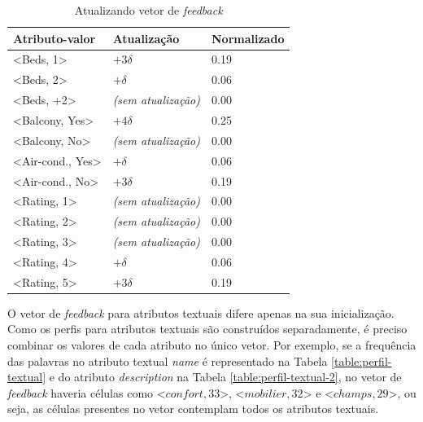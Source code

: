 \begin{table}[]
	\caption{Atualizando vetor de {\em feedback}}
	\label{table:feedback}
	\centering
	\begin{tabular}{lll}
	\hline
	\textbf{Atributo-valor}               & \textbf{Atualização} & \textbf{Normalizado} \\ \hline
	\textless{}Beds, 1\textgreater{}                   & $+3\delta$                       & 0.19                 \\ 
	\textless{}Beds, 2\textgreater{}                 & $+\delta$                       & 0.06                 \\ 
	\textless{}Beds, +2\textgreater{}                  & {\em (sem atualização)}                       & 0.00                    \\ 
	\textless{}Balcony, Yes\textgreater{}                   & $+4\delta$                      & 0.25                 \\ 
	\textless{}Balcony, No\textgreater{}                    & {\em (sem atualização)}                        & 0.00                    \\ 
	\textless{}Air-cond., Yes\textgreater{}               & $+\delta$                       & 0.06                 \\ 
	\textless{}Air-cond., No\textgreater{}                & $+3\delta$                       & 0.19                 \\ 
	\textless{}Rating, 1\textgreater{}                    & {\em (sem atualização)}                       & 0.00                    \\ 
	\textless{}Rating, 2\textgreater{}                     & {\em (sem atualização)}                        & 0.00                    \\ 
	\textless{}Rating, 3\textgreater{}                    & {\em (sem atualização)}                        & 0.00                   \\ 
	\textless{}Rating, 4\textgreater{}                   & $+\delta$                       & 0.06                 \\ 
	\textless{}Rating, 5\textgreater{}                     & $+3\delta$                      & 0.19                 \\ \hline
	\end{tabular}
	\mfonte
\end{table}


O vetor de {\em feedback} para atributos textuais difere apenas na sua inicialização. Como os perfis para atributos textuais são construídos separadamente, é preciso combinar os valores de cada atributo no único vetor. Por exemplo, se a frequência das palavras no atributo textual {\em name} é representado na Tabela \ref{table:perfil-textual} e do atributo {\em description} na Tabela \ref{table:perfil-textual-2}, no vetor de {\em feedback} haveria células como \textless{}$confort, 33$\textgreater{}, \textless{}$mobilier, 32$\textgreater{} e \textless{}$champs, 29$\textgreater{}, ou seja, as células presentes no vetor contemplam todos os atributos textuais.

